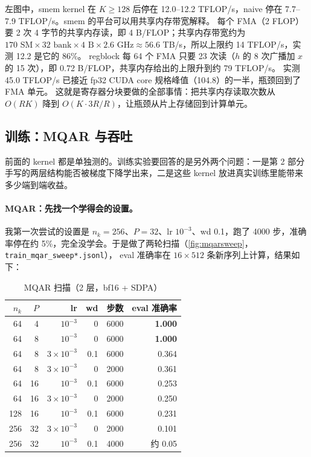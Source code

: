 \documentclass[11pt,a4paper]{ctexart}
\begin{document}
 左图中，smem kernel 在 $K\ge128$ 后停在 12.0–12.2 TFLOP/s，naive 停在 7.7–7.9 TFLOP/s。smem 的平台可以用共享内存带宽解释。
每个 FMA（2 FLOP）要 2 次 4 字节的共享内存读，即 4 B/FLOP；共享内存带宽约为 $170\text{ SM}\times32\text{ bank}\times4\text{ B}\times2.6\text{ GHz}\approx56.6$ TB/s，所以上限约 14 TFLOP/s，实测 12.2 是它的 86\%。
regblock 每 64 个 FMA 只要 23 次读（$h$ 的 8 次广播加 $x$ 的 15 次），即 0.72 B/FLOP，共享内存给出的上限升到约 79 TFLOP/s。
实测 45.0 TFLOP/s 已接近 fp32 CUDA core 规格峰值（104.8）的一半，瓶颈回到了 FMA 单元。
这就是寄存器分块要做的全部事情：把共享内存读取次数从 $O(RK)$ 降到 $O(K\cdot 3R/R)$，让瓶颈从片上存储回到计算单元。

\subsection{训练：MQAR 与吞吐}\label{sec:train}

前面的 kernel 都是单独测的。训练实验要回答的是另外两个问题：一是第 2 部分手写的两层结构能否被梯度下降学出来，二是这些 kernel 放进真实训练里能带来多少端到端收益。

\paragraph{MQAR：先找一个学得会的设置。}
我第一次尝试的设置是 $n_k=256$、$P=32$、lr $10^{-3}$、wd 0.1，跑了 4000 步，准确率停在约 5\%，完全没学会。于是做了两轮扫描（\cref{fig:mqarsweep}，\texttt{train\_mqar\_sweep*.jsonl}），
eval 准确率在 $16\times512$ 条新序列上计算，结果如下：

\begin{table}[H]
\centering\small
\caption{MQAR 扫描（2 层，bf16 + SDPA）}
\label{tab:mqarsweep}
\begin{tabular}{rrrrrr}
\toprule
$n_k$ & $P$ & lr & wd & 步数 & eval 准确率 \\
\midrule
64 & 4 & $10^{-3}$ & 0 & 6000 & \textbf{1.000} \\
64 & 8 & $10^{-3}$ & 0 & 6000 & \textbf{1.000} \\
64 & 8 & $3\times10^{-3}$ & 0.1 & 6000 & 0.364 \\
64 & 8 & $3\times10^{-3}$ & 0 & 2000 & 0.361 \\
64 & 16 & $10^{-3}$ & 0.1 & 6000 & 0.253 \\
64 & 16 & $3\times10^{-3}$ & 0 & 2000 & 0.250 \\
128 & 16 & $10^{-3}$ & 0.1 & 6000 & 0.231 \\
256 & 32 & $3\times10^{-3}$ & 0 & 2000 & 0.101 \\
256 & 32 & $10^{-3}$ & 0.1 & 4000 & 约 0.05 \\
\bottomrule
\end{tabular}
\end{table}
\end{document}
